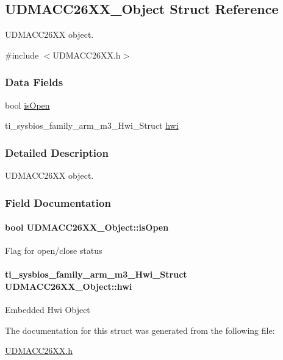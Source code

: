 \subsection{U\+D\+M\+A\+C\+C26\+X\+X\+\_\+\+Object Struct Reference}
\label{struct_u_d_m_a_c_c26_x_x___object}


U\+D\+M\+A\+C\+C26\+X\+X object.  




{\ttfamily \#include $<$U\+D\+M\+A\+C\+C26\+X\+X.\+h$>$}

\subsubsection*{Data Fields}
\begin{DoxyCompactItemize}
\item 
bool \hyperlink{struct_u_d_m_a_c_c26_x_x___object_a90be70e4c9fd4907abdb17412c0cc7f4}{is\+Open}
\item 
ti\+\_\+sysbios\+\_\+family\+\_\+arm\+\_\+m3\+\_\+\+Hwi\+\_\+\+Struct \hyperlink{struct_u_d_m_a_c_c26_x_x___object_a6a51eb783573d5e82352cf74f0b0b051}{hwi}
\end{DoxyCompactItemize}


\subsubsection{Detailed Description}
U\+D\+M\+A\+C\+C26\+X\+X object. 

\subsubsection{Field Documentation}
\paragraph[{is\+Open}]{\setlength{\rightskip}{0pt plus 5cm}bool U\+D\+M\+A\+C\+C26\+X\+X\+\_\+\+Object\+::is\+Open}\label{struct_u_d_m_a_c_c26_x_x___object_a90be70e4c9fd4907abdb17412c0cc7f4}
Flag for open/close status 
\paragraph[{hwi}]{\setlength{\rightskip}{0pt plus 5cm}ti\+\_\+sysbios\+\_\+family\+\_\+arm\+\_\+m3\+\_\+\+Hwi\+\_\+\+Struct U\+D\+M\+A\+C\+C26\+X\+X\+\_\+\+Object\+::hwi}\label{struct_u_d_m_a_c_c26_x_x___object_a6a51eb783573d5e82352cf74f0b0b051}
Embedded Hwi Object 

The documentation for this struct was generated from the following file\+:\begin{DoxyCompactItemize}
\item 
\hyperlink{_u_d_m_a_c_c26_x_x_8h}{U\+D\+M\+A\+C\+C26\+X\+X.\+h}\end{DoxyCompactItemize}
